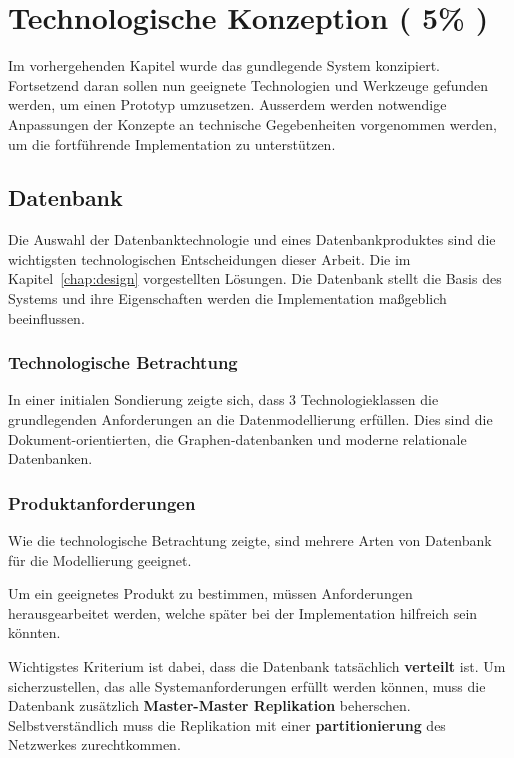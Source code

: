 \chapter{Technologische Konzeption ( 5\% )}


Im vorhergehenden Kapitel wurde das gundlegende System konzipiert.
Fortsetzend daran sollen nun geeignete Technologien und Werkzeuge gefunden werden,
um einen Prototyp umzusetzen.
Ausserdem werden notwendige Anpassungen der Konzepte an technische Gegebenheiten vorgenommen werden,
um die fortf\"uhrende Implementation zu unterst\"utzen.





\section{Datenbank}

Die Auswahl der Datenbanktechnologie und eines Datenbankproduktes sind die wichtigsten technologischen Entscheidungen dieser Arbeit.
Die im Kapitel~\ref{chap:design} vorgestellten L\"osungen.
Die Datenbank stellt die Basis des Systems und ihre Eigenschaften werden die Implementation maßgeblich beeinflussen.


\subsection{Technologische Betrachtung}

In einer initialen Sondierung zeigte sich,
dass 3 Technologieklassen die grundlegenden Anforderungen an die Datenmodellierung erf\"ullen.
Dies sind die Dokument-orientierten, die Graphen-datenbanken und moderne relationale Datenbanken.

\subsection{Produktanforderungen}

Wie die technologische Betrachtung zeigte,
sind mehrere Arten von Datenbank f\"ur die Modellierung geeignet.

Um ein geeignetes Produkt zu bestimmen,
m\"ussen Anforderungen herausgearbeitet werden,
welche sp\"ater bei der Implementation hilfreich sein k\"onnten.

Wichtigstes Kriterium ist dabei, dass die Datenbank tats\"achlich \textbf{verteilt} ist.
Um sicherzustellen, das alle Systemanforderungen erf\"ullt werden k\"onnen,
muss die Datenbank zus\"atzlich \textbf{Master-Master Replikation} beherschen.
Selbstverst\"andlich muss die Replikation mit einer \textbf{partitionierung} des Netzwerkes zurechtkommen.

